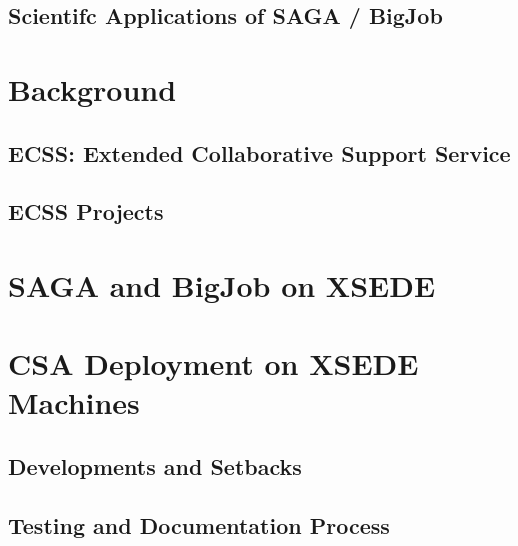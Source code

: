 \documentclass{sig-alternate}
\begin{document}
\subsection{Scientifc Applications of SAGA / BigJob}


\section{Background}
\subsection{ECSS: Extended Collaborative Support Service }
\subsection{ECSS Projects}

\section{SAGA and BigJob on XSEDE}

\section{CSA Deployment on XSEDE Machines}


\subsection{Developments and Setbacks}

\subsection{Testing and Documentation Process}
\end{document}
